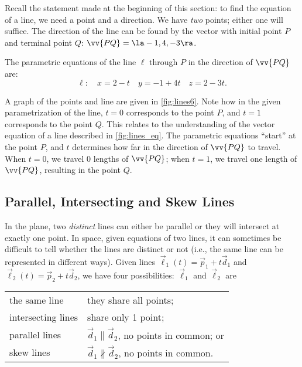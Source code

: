 {Recall the statement made at the beginning of this section: to find the equation of a line, we need a point and a direction. We have \emph{two} points; either one will suffice. The direction of the line can be found by the vector with initial point $P$ and terminal point $Q$: $\vv{PQ} = \la -1,4,-3\ra$.

The parametric equations of the line $\ell$ through $P$ in the direction of $\vv{PQ}$ are:
$$\ell: \quad x= 2-t\quad y=-1+4t \quad z=2-3t.$$

A graph of the points and line are given in \autoref{fig:lines6}. Note how in the given parametrization of the line, $t=0$ corresponds to the point $P$, and $t=1$ corresponds to the point $Q$. This relates to the understanding of the vector equation of a line described in \autoref{fig:lines_eq}. The parametric equations ``start'' at the point $P$, and $t$ determines how far in the direction of $\vv{PQ}$ to travel. When $t=0$, we travel 0 lengths of $\vv{PQ}$; when $t=1$, we travel one length of $\vv{PQ}$, resulting in the point $Q$.}

\subsection*{Parallel, Intersecting and Skew Lines}

In the plane, two \emph{distinct} lines can either be parallel or they will intersect at exactly one point. In space, given equations of two lines, it can sometimes be difficult to tell whether the lines are distinct or not (i.e., the same line can be represented in different ways). Given lines $\vec\ell_1(t) = \vec p_1 + t\vec d_1$ and $\vec \ell_2(t) = \vec p_2+t\vec d_2$, we have four possibilities: $\vec \ell_1$ and $\vec \ell_2$ are

\begin{center}
\begin{tabular}{p{100pt}p{150pt}}
the same line & they share all points; \\
intersecting lines & share only 1 point;\\
parallel lines & $\vec d_1\parallel \vec d_2$, no points in common; or \\
skew lines & $\vec d_1\nparallel \vec d_2$, no points in common. 
\end{tabular}
\end{center}

